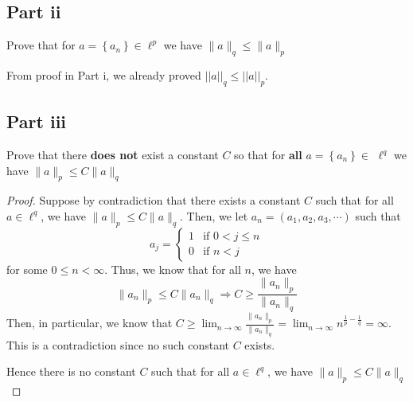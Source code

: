 \subsection{Part ii}

\begin{question}
    Prove that for $a=\left\{a_n\right\} \in \ell^p$ we have $\|a\|_q \leq\|a\|_p$
\end{question}

\begin{answer}
    From proof in Part i, we already proved $\lvert\lvert a \rvert\rvert_q \leq \lvert\lvert a \rvert\rvert_p$.
\end{answer}

\subsection{Part iii}

\begin{question}
   Prove that there \textbf{does not} exist a constant $C$ so that for \textbf{all} $a=\left\{a_n\right\} \in$ $\ell^q$ we have $\|a\|_p \leq C\|a\|_q$
\end{question}

\begin{answer}
    \begin{proof}
        Suppose by contradiction that there exists a constant $C$ such that for all $a \in \ell^q$, we have $\lVert a \rVert_p \leq C \lVert a \rVert_q$. Then, we let $a_n = (a_1,a_2,a_3,\cdots)$ such that 
        \begin{equation}
            a_j =
            \begin{cases}
                1 & \text{if $0 < j \leq n$}\\
                0 & \text{if $n < j$}
            \end{cases}
        \end{equation}
        for some $0 \leq n < \infty$. Thus, we know that for all $n$, we have
        \begin{equation}
                    \lVert a_n \rVert_p \leq C \lVert a_n \rVert_q \Rightarrow C \geq \dfrac{\lVert a_n \rVert_p}{\lVert a_n \rVert_q}
        \end{equation}
        Then, in particular, we know that $C \geq \lim_{n \to \infty}{\tfrac{\lVert a_n \rVert_p}{\lVert a_n \rVert_q}} = \lim_{n \to \infty}{n^{\frac{1}{p} - \frac{1}{q}}} = \infty$. This is a contradiction since no such constant $C$ exists.
        
        Hence there is no constant $C$ such that for all $a \in \ell^q$, we have $\lVert a \rVert_p \leq C \lVert a \rVert_q$
    \end{proof}
\end{answer}
